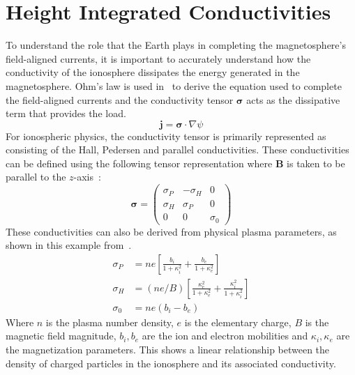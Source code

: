 \section{Height Integrated Conductivities}
\label{sec:height_integrated_conductivities}
To understand the role that the Earth plays in completing the magnetosphere's field-aligned currents, it is important to accurately understand how the conductivity of the ionosphere dissipates the energy generated in the magnetosphere. Ohm's law is used in~\citet{goodman1995} to derive the equation used to complete the field-aligned currents and the conductivity tensor $\bm\sigma$ acts as the dissipative term that provides the load.
\begin{equation}
	\bm j = \bm\sigma\cdot \nabla\psi
	\label{eq:ohms_law}
\end{equation}
For ionospheric physics, the conductivity tensor is primarily represented as consisting of the Hall, Pedersen and parallel conductivities. These conductivities can be defined using the following tensor representation where $\bm B$ is taken to be parallel to the $z$-axis~\citep{kelley2009}:
\begin{equation*}
	\bm\sigma = \begin{pmatrix}
		\sigma_P & -\sigma_H & 0        \\
		\sigma_H & \sigma_P  & 0        \\
		0        & 0         & \sigma_0
	\end{pmatrix}
\end{equation*}
These conductivities can also be derived from physical plasma parameters, as shown in this example from~\citep{kelley2009}.
\begin{equation}
	\begin{aligned}
		\sigma_{P} & =ne\left[\frac{b_i}{1+\kappa_i^2}+\frac{b_e}{1+\kappa_e^2}\right]                    \\
		\sigma_{H} & =(ne/B) \left[\frac{\kappa_e^2}{1+\kappa_e^2}+\frac{\kappa_i^2}{1+\kappa_i^2}\right] \\
		\sigma_{0} & = ne(b_i-b_e)
		\label{eq:physical_conduct}
	\end{aligned}
\end{equation}
Where $n$ is the plasma number density, $e$ is the elementary charge, $B$ is the magnetic field magnitude, $b_i, b_e$ are the ion and electron mobilities and $\kappa_i,\kappa_e$ are the magnetization parameters. This shows a linear relationship between the density of charged particles in the ionosphere and its associated conductivity.

